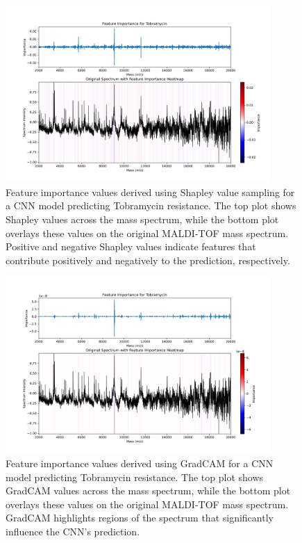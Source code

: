 \documentclass[english,11pt,a4paper,titlepage]{article}
\begin{document}
\begin{figure}[h]
	\centering
	\includegraphics[width=0.9\textwidth]{img/Tobramycin_shapley.png}
	\caption{Feature importance values derived using Shapley value sampling for a CNN model predicting Tobramycin resistance. The top plot shows Shapley values across the mass spectrum, while the bottom plot overlays these values on the original MALDI-TOF mass spectrum. Positive and negative Shapley values indicate features that contribute positively and negatively to the prediction, respectively.}
	\label{fig:feature_shapley}
\end{figure}
\begin{figure}[h]
	\centering
	\includegraphics[width=0.9\textwidth]{img/Tobramycin_gradcam.png}
	\caption{Feature importance values derived using GradCAM for a CNN model predicting Tobramycin resistance. The top plot shows GradCAM values across the mass spectrum, while the bottom plot overlays these values on the original MALDI-TOF mass spectrum. GradCAM highlights regions of the spectrum that significantly influence the CNN's prediction.}
	\label{fig:feature_gradcam}
\end{figure}
\end{document}
